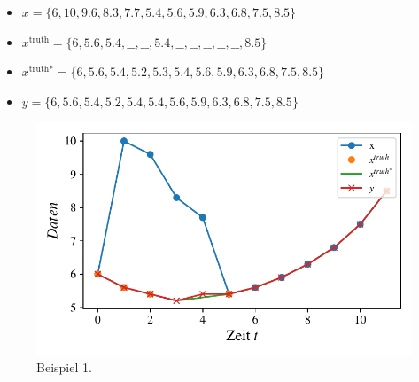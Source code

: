 \begin{itemize}
    \item $x =                 \{6, 10, 9.6, 8.3, 7.7, 5.4, 5.6, 5.9, 6.3, 6.8, 7.5, 8.5\}$
    \item $x^{\text{truth}} =  \{6, 5.6, 5.4,  \_\_, \_\_,5.4, \_\_,\_\_,\_\_,\_\_,\_\_,8.5\}$
    \item $x^{\text{truth*}} =  \{6, 5.6, 5.4,  5.2, 5.3, 5.4, 5.6, 5.9, 6.3, 6.8, 7.5, 8.5\}$
    \item $y =  \{6, 5.6, 5.4,  5.2, 5.4, 5.4, 5.6, 5.9, 6.3, 6.8, 7.5, 8.5\}$
\end{itemize}
\begin{figure}
      \includegraphics[width=\textwidth,keepaspectratio]{../plots/beispiel1_data.pdf}
    \caption{Beispiel 1.}\label{fig:1}
\end{figure}
